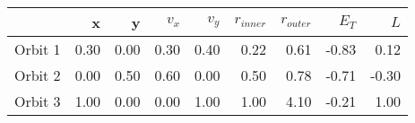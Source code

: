 \begin{tabular}{lrrrrrrrr}
\toprule
{} &    x &    y &  $v_x$ &  $v_y$ &  $r_{inner}$ &  $r_{outer}$ &  $E_T$ &   $L$ \\
\midrule
Orbit 1 & 0.30 & 0.00 &   0.30 &   0.40 &         0.22 &         0.61 &  -0.83 &  0.12 \\
Orbit 2 & 0.00 & 0.50 &   0.60 &   0.00 &         0.50 &         0.78 &  -0.71 & -0.30 \\
Orbit 3 & 1.00 & 0.00 &   0.00 &   1.00 &         1.00 &         4.10 &  -0.21 &  1.00 \\
\bottomrule
\end{tabular}
